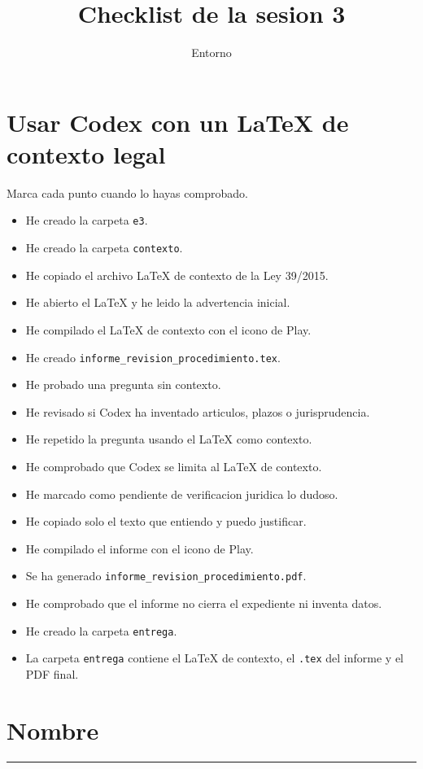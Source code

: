 \documentclass[a4paper,12pt]{article}
\title{Checklist de la sesion 3}
\author{Entorno}
\date{}
\begin{document}
\maketitle

\section*{Usar Codex con un LaTeX de contexto legal}

Marca cada punto cuando lo hayas comprobado.

\begin{itemize}
    \item[$\square$] He creado la carpeta \texttt{e3}.
    \item[$\square$] He creado la carpeta \texttt{contexto}.
    \item[$\square$] He copiado el archivo LaTeX de contexto de la Ley 39/2015.
    \item[$\square$] He abierto el LaTeX y he leido la advertencia inicial.
    \item[$\square$] He compilado el LaTeX de contexto con el icono de Play.
    \item[$\square$] He creado \texttt{informe\_revision\_procedimiento.tex}.
    \item[$\square$] He probado una pregunta sin contexto.
    \item[$\square$] He revisado si Codex ha inventado articulos, plazos o jurisprudencia.
    \item[$\square$] He repetido la pregunta usando el LaTeX como contexto.
    \item[$\square$] He comprobado que Codex se limita al LaTeX de contexto.
    \item[$\square$] He marcado como pendiente de verificacion juridica lo dudoso.
    \item[$\square$] He copiado solo el texto que entiendo y puedo justificar.
    \item[$\square$] He compilado el informe con el icono de Play.
    \item[$\square$] Se ha generado \texttt{informe\_revision\_procedimiento.pdf}.
    \item[$\square$] He comprobado que el informe no cierra el expediente ni inventa datos.
    \item[$\square$] He creado la carpeta \texttt{entrega}.
    \item[$\square$] La carpeta \texttt{entrega} contiene el LaTeX de contexto, el \texttt{.tex} del informe y el PDF final.
\end{itemize}

\section*{Nombre}

\vspace{1cm}

\hrule
\end{document}

